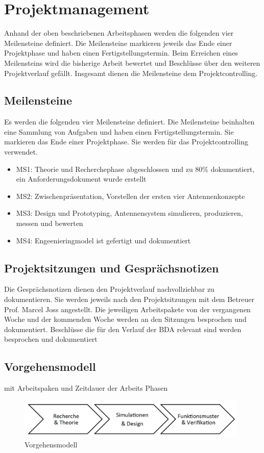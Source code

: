 \newpage
\chapter{Projektmanagement}
Anhand der oben beschriebenen Arbeitsphasen werden die folgenden vier Meilensteine definiert. Die Meilensteine markieren jeweils das Ende einer Projektphase und haben einen Fertigstellungstermin. Beim Erreichen eines Meilensteins wird die bisherige Arbeit bewertet und Beschlüsse über den weiteren Projektverlauf gefällt. Insgesamt dienen die Meilensteine dem Projektcontrolling.
\section{Meilensteine}
Es werden die folgenden vier Meilensteine definiert. Die Meilensteine
beinhalten   eine Sammlung von Aufgaben und haben einen
Fertigstellungstermin. Sie markieren das Ende einer Projektphase. Sie
werden für das Projektcontrolling verwendet. 
	\begin{itemize}
		\item MS1: Theorie und Recherchephase abgeschlossen und zu 80\% dokumentiert, ein Anforderungsdokument wurde erstellt
		\item MS2: Zwischenpräsentation, Vorstellen der ersten vier Antennenkonzepte
		\item MS3: Design und Prototyping, Antennensystem simulieren, produzieren, messen und bewerten
		\item MS4: Engeenieringmodel ist gefertigt und dokumentiert
	\end{itemize}

\section{Projektsitzungen und Gesprächsnotizen}
Die Gesprächsnotizen dienen den Projektverlauf nachvollziehbar zu dokumentieren. Sie werden jeweils nach den Projektsitzungen mit dem Betreuer Prof. Marcel Joss angestellt. Die jeweiligen Arbeitspakete von der vergangenen Woche und der kommenden Woche werden an den Sitzungen besprochen und dokumentiert. Beschlüsse die für den Verlauf der BDA relevant sind werden besprochen und dokumentiert
\section{Vorgehensmodell}
mit Arbeitspaken und Zeitdauer der Arbeits Phasen
\begin{figure}[!ht]
	\begin{center}
		\includegraphics[width=11cm]{content/bilder/Vorgehensmodell.pdf}%
	\end{center}
	\caption{Vorgehensmodell}
	\label{Vorgehensmodell}
\end{figure}
